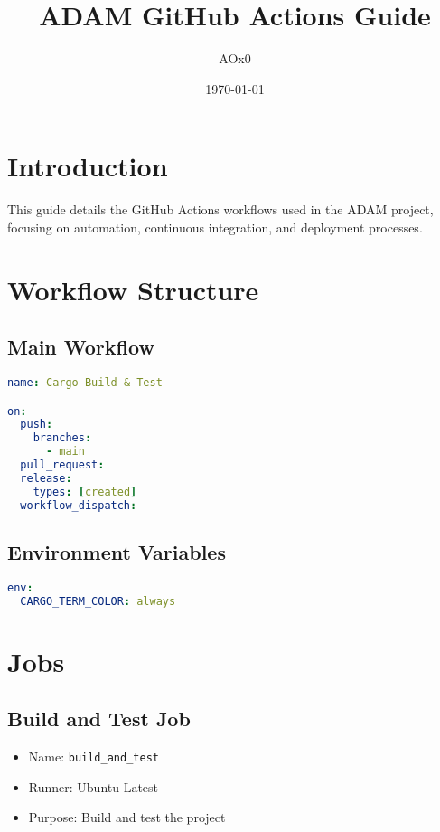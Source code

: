 \documentclass{article}
\title{ADAM GitHub Actions Guide}
\author{AOx0}
\date{\today}
\begin{document}
\maketitle

\section{Introduction}
This guide details the GitHub Actions workflows used in the ADAM project, focusing on automation, continuous integration, and deployment processes.

\section{Workflow Structure}

\subsection{Main Workflow}
\begin{lstlisting}[language=yaml]
name: Cargo Build & Test

on:
  push:
    branches:
      - main
  pull_request:
  release:
    types: [created]
  workflow_dispatch:
\end{lstlisting}

\subsection{Environment Variables}
\begin{lstlisting}[language=yaml]
env:
  CARGO_TERM_COLOR: always
\end{lstlisting}

\section{Jobs}

\subsection{Build and Test Job}
\begin{itemize}
    \item Name: \texttt{build\_and\_test}
    \item Runner: Ubuntu Latest
    \item Purpose: Build and test the project
\end{itemize}
\end{document}
